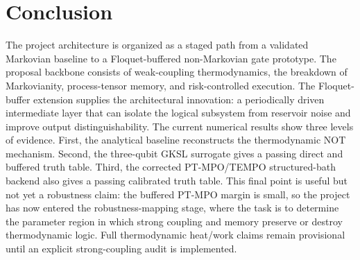 \documentclass[11pt]{article}
\begin{document}
\section{Conclusion}

The project architecture is organized as a staged path from a validated Markovian baseline
to a Floquet-buffered non-Markovian gate prototype.  The proposal backbone consists of
weak-coupling thermodynamics, the breakdown of Markovianity, process-tensor memory, and
risk-controlled execution.  The Floquet-buffer extension supplies the architectural
innovation: a periodically driven intermediate layer that can isolate the logical subsystem
from reservoir noise and improve output distinguishability.  The current numerical results
show three levels of evidence.  First, the analytical baseline reconstructs the thermodynamic
NOT mechanism.  Second, the three-qubit GKSL surrogate gives a passing direct and buffered
truth table.  Third, the corrected PT-MPO/TEMPO structured-bath backend also gives a
passing calibrated truth table.  This final point is useful but not yet a robustness claim:
the buffered PT-MPO margin is small, so the project has now entered the robustness-mapping
stage, where the task is to determine the parameter region in which strong coupling and
memory preserve or destroy thermodynamic logic.  Full
thermodynamic heat/work claims remain provisional until an explicit strong-coupling audit is
implemented.
\end{document}
